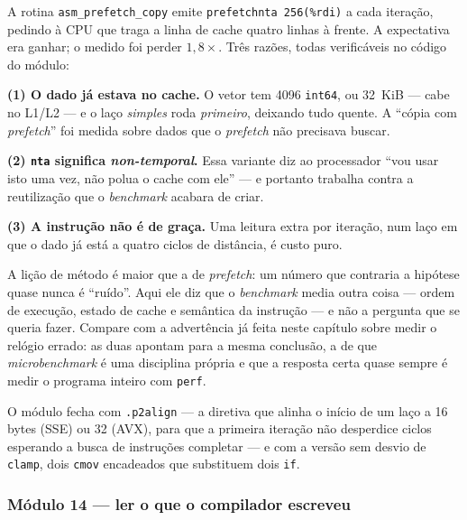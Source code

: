 \begin{armadilha}
A rotina \texttt{asm\_prefetch\_copy} emite \texttt{prefetchnta 256(\%rdi)} a
cada iteração, pedindo à CPU que traga a linha de cache quatro linhas à frente.
A expectativa era ganhar; o medido foi perder $1{,}8\times$. Três razões, todas
verificáveis no código do módulo:

\textbf{(1) O dado já estava no cache.} O vetor tem 4096 \texttt{int64}, ou
32~KiB --- cabe no L1/L2 --- e o laço \emph{simples} roda \emph{primeiro},
deixando tudo quente. A ``cópia com \emph{prefetch}'' foi medida sobre dados que
o \emph{prefetch} não precisava buscar.

\textbf{(2) \texttt{nta} significa \emph{non-temporal}.} Essa variante diz ao
processador ``vou usar isto uma vez, não polua o cache com ele'' --- e portanto
trabalha contra a reutilização que o \emph{benchmark} acabara de criar.

\textbf{(3) A instrução não é de graça.} Uma leitura extra por iteração, num
laço em que o dado já está a quatro ciclos de distância, é custo puro.

A lição de método é maior que a de \emph{prefetch}: um número que contraria a
hipótese quase nunca é ``ruído''. Aqui ele diz que o \emph{benchmark} media
outra coisa --- ordem de execução, estado de cache e semântica da instrução ---
e não a pergunta que se queria fazer. Compare com a advertência já feita neste
capítulo sobre medir o relógio errado: as duas apontam para a mesma conclusão,
a de que \emph{microbenchmark} é uma disciplina própria e que a resposta certa
quase sempre é medir o programa inteiro com \texttt{perf}.
\end{armadilha}

O módulo fecha com \texttt{.p2align} --- a diretiva que alinha o início de um
laço a 16 bytes (SSE) ou 32 (AVX), para que a primeira iteração não desperdice
ciclos esperando a busca de instruções completar --- e com a versão sem desvio
de \texttt{clamp}, dois \texttt{cmov} encadeados que substituem dois
\texttt{if}.

\subsubsection{Módulo 14 --- ler o que o compilador escreveu}

